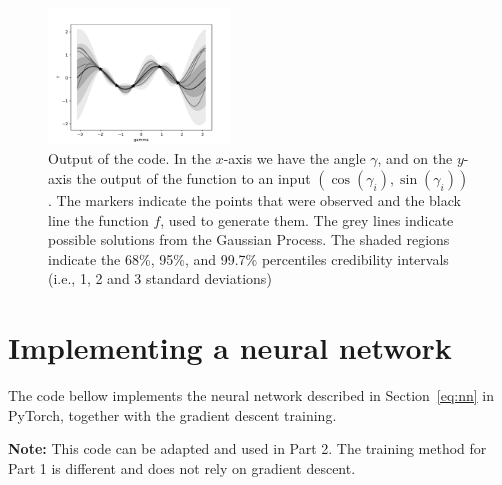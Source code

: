 \documentclass[a4paper,10pt]{article}
\newenvironment{note}
{
\begin{center}
\begin{lrbox}{\mybox}
\begin{minipage}{42em}}
{\end{minipage}
\end{lrbox}\fbox{\usebox{\mybox}}
\end{center}}
\begin{document}



\begin{figure}[H]
    \centering
    \includegraphics[width=0.43\textwidth]{img/gaussian_process.pdf}
    \caption{Output of the code. In the $x$-axis we have the angle $\gamma$, and on the $y$-axis the output of the function to an input $(\cos(\gamma_i), \sin(\gamma_i))$. The markers indicate the points that were observed and the black line the function $f$, used to generate them. The grey lines indicate possible solutions from the Gaussian Process. The shaded regions indicate the 68\%, 95\%, and 99.7\% percentiles credibility intervals (i.e.,  1, 2 and 3 standard deviations)}
    \label{fig:gp}
\end{figure}

\section{Implementing a neural network}
\label{sec:nn}

The code bellow implements the neural network described in Section~\ref{eq:nn} in PyTorch, together with the gradient descent training.

\begin{note}
    \textbf{Note:}  This code can be adapted and  used in Part 2.  The training method for Part 1 is different and does not rely on gradient descent.
\end{note}



\end{document}
